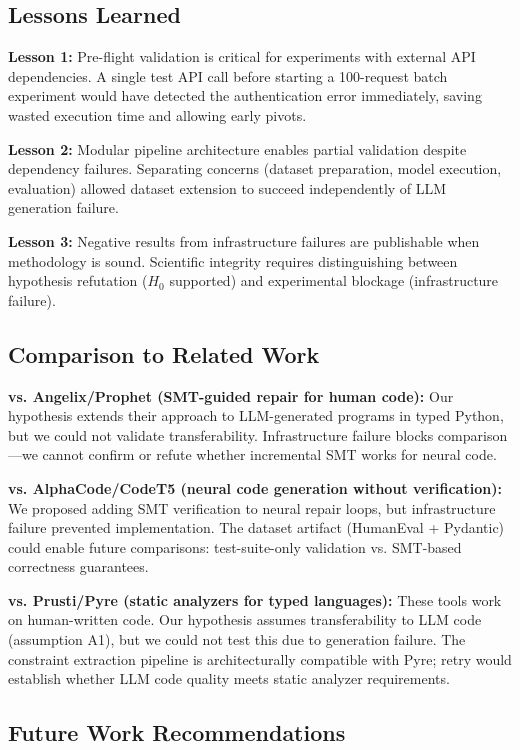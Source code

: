 \subsection{Lessons Learned}

\textbf{Lesson 1:} Pre-flight validation is critical for experiments with external API dependencies. A single test API call before starting a 100-request batch experiment would have detected the authentication error immediately, saving wasted execution time and allowing early pivots.

\textbf{Lesson 2:} Modular pipeline architecture enables partial validation despite dependency failures. Separating concerns (dataset preparation, model execution, evaluation) allowed dataset extension to succeed independently of LLM generation failure.

\textbf{Lesson 3:} Negative results from infrastructure failures are publishable when methodology is sound. Scientific integrity requires distinguishing between hypothesis refutation ($H_0$ supported) and experimental blockage (infrastructure failure).

\subsection{Comparison to Related Work}

\textbf{vs. Angelix/Prophet (SMT-guided repair for human code):} Our hypothesis extends their approach to LLM-generated programs in typed Python, but we could not validate transferability. Infrastructure failure blocks comparison---we cannot confirm or refute whether incremental SMT works for neural code.

\textbf{vs. AlphaCode/CodeT5 (neural code generation without verification):} We proposed adding SMT verification to neural repair loops, but infrastructure failure prevented implementation. The dataset artifact (HumanEval + Pydantic) could enable future comparisons: test-suite-only validation vs. SMT-based correctness guarantees.

\textbf{vs. Prusti/Pyre (static analyzers for typed languages):} These tools work on human-written code. Our hypothesis assumes transferability to LLM code (assumption A1), but we could not test this due to generation failure. The constraint extraction pipeline is architecturally compatible with Pyre; retry would establish whether LLM code quality meets static analyzer requirements.

\subsection{Future Work Recommendations}

